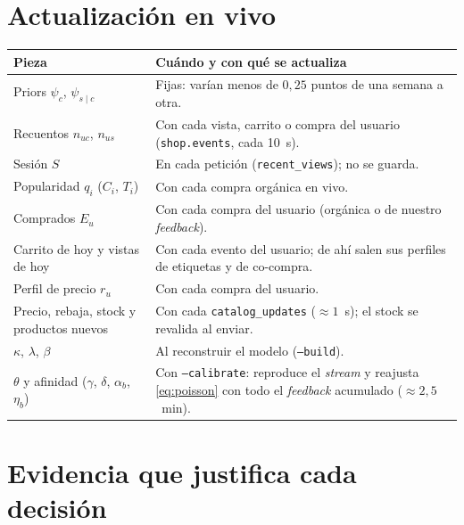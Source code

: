 \documentclass[11pt,a4paper]{article}
\newcommand{\cod}[1]{\texttt{#1}}
\begin{document}
\section{Actualización en vivo}

\begin{center}
\begin{tabular}{p{6.2cm}p{8.6cm}}
\toprule
Pieza & Cuándo y con qué se actualiza\\
\midrule
Priors $\psi_c$, $\psi_{s\mid c}$ & Fijas: varían menos de $0{,}25$ puntos de una semana a otra.\\
Recuentos $n_{uc}$, $n_{us}$ & Con cada vista, carrito o compra del usuario (\cod{shop.events}, cada 10~s).\\
Sesión $S$ & En cada petición (\cod{recent\_views}); no se guarda.\\
Popularidad $q_i$ ($C_i$, $T_i$) & Con cada compra orgánica en vivo.\\
Comprados $E_u$ & Con cada compra del usuario (orgánica o de nuestro \emph{feedback}).\\
Carrito de hoy y vistas de hoy & Con cada evento del usuario; de ahí salen sus perfiles de etiquetas y de co-compra.\\
Perfil de precio $r_u$ & Con cada compra del usuario.\\
Precio, rebaja, stock y productos nuevos & Con cada \cod{catalog\_updates} ($\approx 1$~s); el stock se revalida al enviar.\\
$\kappa$, $\lambda$, $\beta$ & Al reconstruir el modelo (\cod{--build}).\\
$\theta$ y afinidad ($\gamma$, $\delta$, $\alpha_b$, $\eta_b$) & Con \cod{--calibrate}: reproduce el \emph{stream} y reajusta
\eqref{eq:poisson} con todo el \emph{feedback} acumulado ($\approx 2{,}5$~min).\\
\bottomrule
\end{tabular}
\end{center}

\section{Evidencia que justifica cada decisión}
\end{document}
